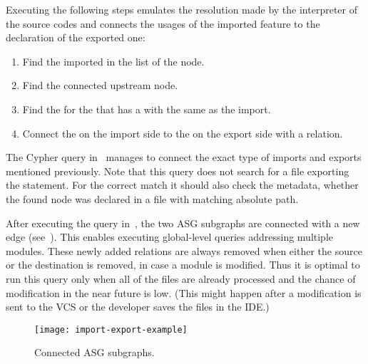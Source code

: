 Executing the following steps emulates the resolution made by the interpreter of the source codes and connects the usages of the imported feature to the declaration of the exported one:

\begin{enumerate}[topsep=0pt]
	\item Find the imported  in the  list of the  node.
	\item Find the connected upstream  node.
	\item Find the  for the  that has a  with the same  as the import.
	\item Connect the  on the import side to the  on the export side with a  relation.
\end{enumerate}

The Cypher query in~ manages to connect the exact type of imports and exports mentioned previously. Note that this query does not search for a file exporting the statement. For the correct match it should also check the metadata, whether the found node was declared in a file with matching absolute path.

\begin{figure}[!htb]
	\begin{minipage}{\textwidth}
		
	\end{minipage}
\end{figure}

After executing the query in~, the two ASG subgraphs are connected with a new edge (see~). This enables executing global-level queries addressing multiple modules. These newly added relations are always removed when either the source or the destination is removed, in case a module is modified. Thus it is optimal to run this query only when all of the files are already processed and the chance of modification in the near future is low. (This might happen after a modification is sent to the VCS or the developer saves the files in the IDE.)

\begin{sidewaysfigure}[htbp]
  \centering
  \texttt{[image: import-export-example]}
  \caption{Connected ASG subgraphs.}
  \label{fig:import-export-example}
\end{sidewaysfigure}


